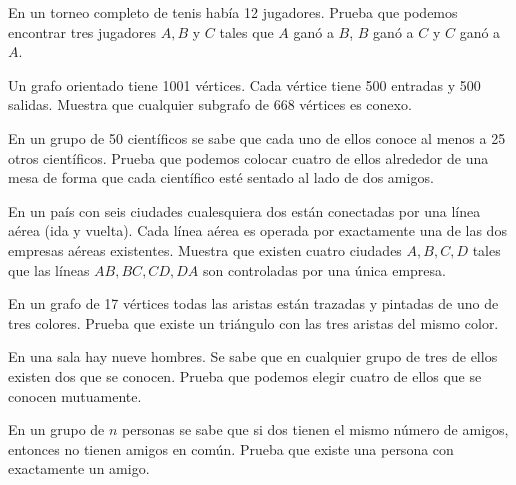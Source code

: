 \documentclass[11pt]{scrartcl}
\begin{document}
\begin{problem}
En un torneo completo de tenis había 12 jugadores. Prueba que podemos encontrar tres jugadores \( A, B \) y \( C \) tales que \( A \) ganó a \( B \), \( B \) ganó a \( C \) y \( C \) ganó a \( A \).
\end{problem}

\begin{problem}
    Un grafo orientado tiene 1001 vértices. Cada vértice tiene 500 entradas y 500 salidas. Muestra que cualquier subgrafo de 668 vértices es conexo.
\end{problem}

\begin{problem}
    En un grupo de 50 científicos se sabe que cada uno de ellos conoce al menos a 25 otros científicos. Prueba que podemos colocar cuatro de ellos alrededor de una mesa de forma que cada científico esté sentado al lado de dos amigos.
\end{problem}

\begin{problem}
    En un país con seis ciudades cualesquiera dos están conectadas por una línea aérea (ida y vuelta). Cada línea aérea es operada por exactamente una de las dos empresas aéreas existentes. Muestra que existen cuatro ciudades \( A, B, C, D \) tales que las líneas \( AB, BC, CD, DA \) son controladas por una única empresa.
\end{problem}

\begin{problem}
    En un grafo de 17 vértices todas las aristas están trazadas y pintadas de uno de tres colores. Prueba que existe un triángulo con las tres aristas del mismo color.
\end{problem}

\begin{problem}
    En una sala hay nueve hombres. Se sabe que en cualquier grupo de tres de ellos existen dos que se conocen. Prueba que podemos elegir cuatro de ellos que se conocen mutuamente.
\end{problem}

\begin{problem}
    En un grupo de \( n \) personas se sabe que si dos tienen el mismo número de amigos, entonces no tienen amigos en común. Prueba que existe una persona con exactamente un amigo.
\end{problem}

%
\end{document}
